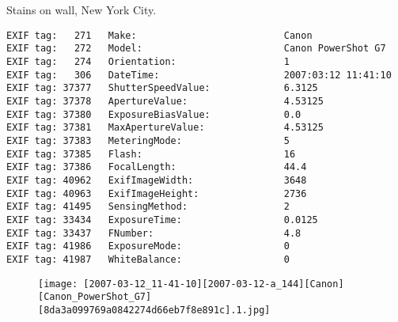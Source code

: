 \section{\protect{}}
\noindent Stains on wall, New York City.
\noindent
\begin{lstlisting}
EXIF tag:   271   Make:                          Canon
EXIF tag:   272   Model:                         Canon PowerShot G7
EXIF tag:   274   Orientation:                   1
EXIF tag:   306   DateTime:                      2007:03:12 11:41:10
EXIF tag: 37377   ShutterSpeedValue:             6.3125
EXIF tag: 37378   ApertureValue:                 4.53125
EXIF tag: 37380   ExposureBiasValue:             0.0
EXIF tag: 37381   MaxApertureValue:              4.53125
EXIF tag: 37383   MeteringMode:                  5
EXIF tag: 37385   Flash:                         16
EXIF tag: 37386   FocalLength:                   44.4
EXIF tag: 40962   ExifImageWidth:                3648
EXIF tag: 40963   ExifImageHeight:               2736
EXIF tag: 41495   SensingMethod:                 2
EXIF tag: 33434   ExposureTime:                  0.0125
EXIF tag: 33437   FNumber:                       4.8
EXIF tag: 41986   ExposureMode:                  0
EXIF tag: 41987   WhiteBalance:                  0

\end{lstlisting}
\clearpage
\begin{figure}
\raggedleft
\texttt{[image: [2007-03-12\_11-41-10][2007-03-12-a\_144][Canon][Canon\_PowerShot\_G7][8da3a099769a0842274d66eb7f8e891c].1.jpg]}
\end{figure}


\clearpage
